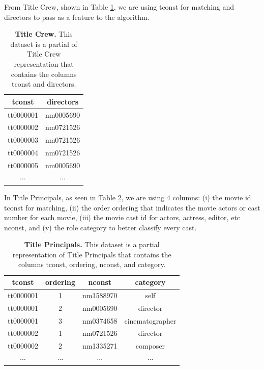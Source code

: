 From Title Crew, shown in Table \ref{tab:crew}, we are using tconst for matching and directors to pass as a feature to the algorithm.

\begin{table}[ht]
	\centering
	\caption{\textbf{Title Crew.} This dataset is a partial of Title Crew representation that contains the columns tconst and directors.}
	\footnotesize
	\begin{tabular}{cc}
		\toprule
		tconst    & directors \\
		\midrule
		tt0000001 & nm0005690 \\
		tt0000002 & nm0721526 \\
		tt0000003 & nm0721526 \\
		tt0000004 & nm0721526 \\		
		tt0000005 & nm0005690 \\
		$\cdots$  & $\cdots$  \\
		\bottomrule
	\end{tabular}	
 	\label{tab:crew}
\end{table}

In Title Principals, as seen in Table \ref{tab:principals}, we are using 4 columns:  (i) the movie id tconst for matching, (ii) the order ordering that indicates the movie actors or cast number for each movie, (iii) the movie cast id for actors, actress, editor, etc nconst, and (v) the role category to better classify every cast.

\begin{table}[ht]
	\centering
	\caption{\textbf{Title Principals.} This dataset is a partial representation of Title Principals that contains the columns tconst, ordering, nconst, and category.}
	\footnotesize
	\begin{tabular}{cccc}
		\toprule
		tconst    & ordering & nconst    & category        \\
		\midrule
		tt0000001 & 1        & nm1588970 & self            \\
		tt0000001 & 2        & nm0005690 & director        \\
		tt0000001 & 3        & nm0374658 & cinematographer \\
		tt0000002 & 1        & nm0721526 & director        \\		
		tt0000002 & 2        & nm1335271 & composer        \\
		$\cdots$  & $\cdots$ &  $\cdots$ & $\cdots$        \\
		\bottomrule
	\end{tabular}	
 	\label{tab:principals}
\end{table}

